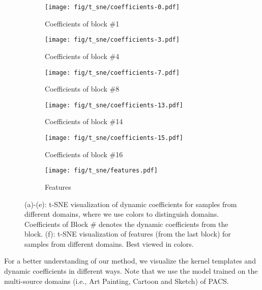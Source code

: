 \documentclass{article}
\begin{document}
\begin{figure}[t]
     \centering
\begin{subfigure}[b]{0.49\columnwidth}
         \centering
         \texttt{[image: fig/t\_sne/coefficients-0.pdf]}
         \caption{Coefficients of block \#1}
     \end{subfigure}
     \hfill
     \begin{subfigure}[b]{0.49\columnwidth}
         \centering
         \texttt{[image: fig/t\_sne/coefficients-3.pdf]}
         \caption{Coefficients of block \#4}
     \end{subfigure}
     \begin{subfigure}[b]{0.49\columnwidth}
         \centering
         \texttt{[image: fig/t\_sne/coefficients-7.pdf]}
         \caption{Coefficients of block \#8}
     \end{subfigure}
     \hfill
     \begin{subfigure}[b]{0.49\columnwidth}
         \centering
         \texttt{[image: fig/t\_sne/coefficients-13.pdf]}
         \caption{Coefficients of block \#14}
     \end{subfigure}
     \begin{subfigure}[b]{0.49\columnwidth}
         \centering
         \texttt{[image: fig/t\_sne/coefficients-15.pdf]}
         \caption{Coefficients of block \#16}
     \end{subfigure}
     \hfill
     \begin{subfigure}[b]{0.49\columnwidth}
         \centering
         \texttt{[image: fig/t\_sne/features.pdf]}
         \caption{Features}
     \end{subfigure}
     
\caption{(a)-(e): t-SNE visualization of dynamic coefficients for samples from different domains, where we use colors to distinguish domains. Coefficients of Block \# denotes the dynamic coefficients from the  block. (f): t-SNE visualization of features (from the last block) for samples from different domains. Best viewed in colors.}
        \label{fig:tsne}
\end{figure}

For a better understanding of our method, we visualize the kernel templates and dynamic coefficients in different ways. Note that we use the model trained on the multi-source domains (i.e., Art Painting, Cartoon and Sketch) of PACS. 
\end{document}
